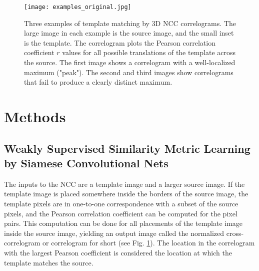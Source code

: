\documentclass{article}
\begin{document}
\begin{figure}[h]
  \centering
  
  \texttt{[image: examples\_original.jpg]}
  \caption{Three examples of template matching by 3D NCC correlograms. The large image in each example is the source image, and the small inset is the template. The correlogram plots the Pearson correlation coefficient $r$ values for all possible translations of the template across the source. The first image shows a correlogram with a well-localized maximum ("peak"). The second and third images show correlograms that fail to produce a clearly distinct maximum.}
  \label{ncc_examples}
\end{figure}


\section{Methods}

\subsection{Weakly Supervised Similarity Metric Learning by Siamese Convolutional Nets}

The inputs to the NCC are a template image and a larger source image. If the template image is placed somewhere inside the borders of the source image, the template pixels are in one-to-one correspondence with a subset of the source pixels, and the Pearson correlation coefficient can be computed for the pixel pairs. This computation can be done for all placements of the template image inside the source image, yielding an output image called the normalized cross-correlogram or correlogram for short (see Fig. \ref{ncc_examples}). The location in the correlogram with the largest Pearson coefficient is considered the location at which the template matches the source. 
\end{document}
